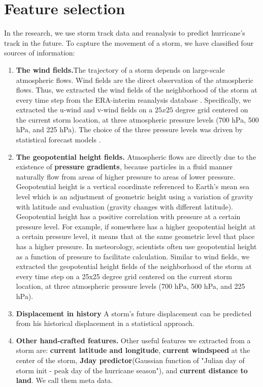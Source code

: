 \section{Feature selection}
In the research, we use storm track data and reanalysis to predict hurricane's track in the future. To capture the movement of a storm, we have classified four sources of information: 
\begin{enumerate}[leftmargin=2em]
	\item \textbf{The wind fields.}The trajectory of a storm depends on large-scale atmospheric flows. Wind fields are the direct observation of the atmospheric flows. Thus, we extracted the wind fields of the neighborhood of the storm at every time step from the ERA-interim reanalysis database \cite{dee2011era}. Specifically, we extracted the u-wind and v-wind fields on a $25x25$ degree grid centered on the current storm location, at three atmospheric pressure levels (700 hPa, 500 hPa, and 225 hPa). The choice of the three pressure levels was driven by statistical forecast models \cite{demaria2005further}. 
	\item \textbf{The geopotential height fields.} Atmospheric flows are directly due to the existence of \textbf{pressure gradients}, because particles in a fluid manner naturally flow from areas of higher pressure to areas of lower pressure. Geopotential height is a vertical coordinate referenced to Earth's mean sea level which is an adjustment of geometric height using a variation of gravity with latitude and evaluation (gravity changes with different latitude). Geopotential height has a positive correlation with pressure at a certain pressure level. For example, if somewhere has a higher geopotential height at a certain pressure level, it means that at the same geometric level that place has a higher pressure. In meteorology, scientists often use geopotential height as a function of pressure to facilitate calculation. Similar to wind fields, we extracted the geopotential height fields of the neighborhood of the storm at every time step on a 25x25 degree grid centered on the current storm location, at three atmospheric pressure levels (700 hPa, 500 hPa, and 225 hPa).
	
	\item \textbf{Displacement in history} A storm's future displacement can be predicted from his historical displacement in a statistical approach.
	
	\item \textbf{Other hand-crafted features.}
	Other useful features we extracted from a storm are: \textbf{current latitude and longitude}, \textbf{current windspeed} at the center of the storm, \textbf{Jday predictor}(Gaussian function of "Julian day of storm init - peak day of the hurricane season"\cite{demaria2005further}), and \textbf{current distance to land}. We call them meta data.
\end{enumerate}

